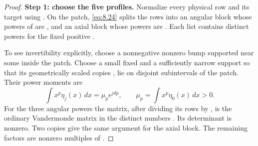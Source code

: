 \begin{proof}
\textbf{Step 1: choose the five profiles.} Normalize every physical row and its target using
. On the patch, \eqref{eq:8.24} splits the rows into an angular block whose
powers of  are , and an axial
block whose powers are . Each list contains distinct powers for
the fixed positive .

To see invertibility explicitly, choose a nonnegative nonzero bump
 supported near some  inside the patch.
Choose a small fixed  and a sufficiently narrow support so that its
geometrically scaled copies
, lie on disjoint
subintervals of the patch. Their power moments are
\[
\int x^p\eta_j(x)\,dx=\mu_p e^{jdp},\qquad
\mu_p=\int x^p\eta_0(x)\,dx>0.
\]
For the three angular powers the matrix, after dividing its rows by
, is the ordinary Vandermonde matrix in the distinct numbers
. Its determinant is nonzero. Two copies give the same argument for
the axial block. The remaining factors are nonzero multiples of
.


\end{proof}
